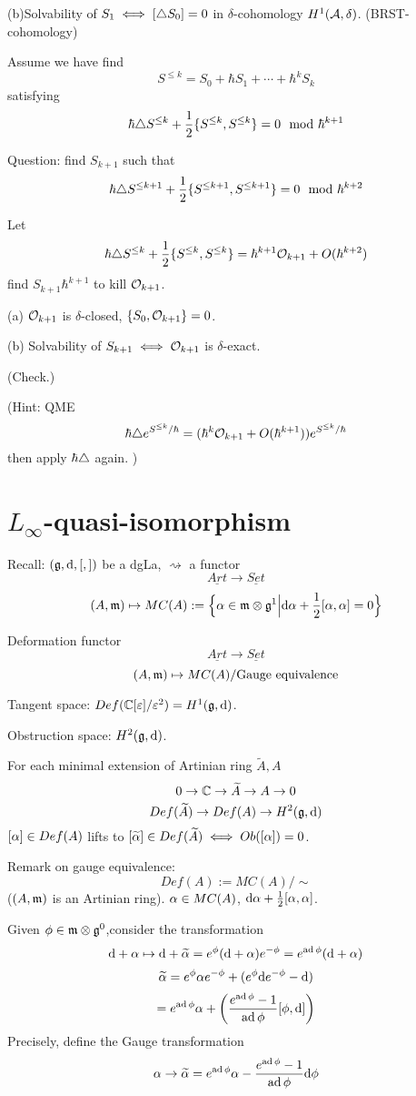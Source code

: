 (b)Solvability of $S_1\iff[\triangle S_0]=0$ in $\delta$-cohomology $H^1(\mathcal{A},\delta)$.
(BRST-cohomology)

Assume we have find
$$S^{\leq k}=S_0+\hbar S_1+\cdots+\hbar^k S_k$$
satisfying
$$\hbar\triangle S^{\leq k}+\frac{1}{2}\{S^{\leq k},S^{\leq k}\}=0\mod\hbar^{k+1}$$

Question: find $S_{k+1}$ such that
$$\hbar\triangle S^{\leq k+1}+
\frac{1}{2}\{S^{\leq k+1},S^{\leq k+1}\}=0\mod\hbar^{k+2}$$

Let
$$\hbar\triangle S^{\leq k}+\frac{1}{2}\{S^{\leq k},S^{\leq k}\}
=\hbar^{k+1}\mathcal{O}_{k+1}+O(\hbar^{k+2})$$
find $S_{k+1}\hbar^{k+1}$ to kill $\mathcal{O}_{k+1}$.

(a) $\mathcal{O}_{k+1}$ is $\delta$-closed, $\{S_0,\mathcal{O}_{k+1}\}=0$.

(b) Solvability of $S_{k+1}\iff \mathcal{O}_{k+1}$ is $\delta$-exact.

(Check.)

(Hint: QME
$$\hbar \triangle e^{S^{\leq k}/\hbar}
=(\hbar^k\mathcal{O}_{k+1}+O(\hbar^{k+1}))e^{S^{\leq k}/\hbar}$$
then apply $\hbar\triangle$ again.
)



\section{$L_\infty$-quasi-isomorphism}
Recall: 
$(\mathfrak{g},\mathrm{d},[,])$ be a dgLa, $\rightsquigarrow$ a functor
$$\underline{Art}\to \underline{Set}$$
$$(A,\mathfrak{m})\mapsto MC(A):=
\Big\{ \alpha\in\mathfrak{m}\otimes\mathfrak{g}^1 \Big| \mathrm{d}\alpha+\frac{1}{2}[\alpha,\alpha]=0 \Big\}$$

Deformation functor
$$\underline{Art}\to\underline{Set}$$
$$(A,\mathfrak{m})\mapsto MC(A)/\text{Gauge equivalence}$$

Tangent space: $Def(\mathbb{C}[\varepsilon]/\varepsilon^2)=H^1(\mathfrak{g},\mathrm{d})$.

Obstruction space: $H^2(\mathfrak{g},\mathrm{d})$.

For each minimal extension of Artinian ring $\widetilde{A},A$
$$0\to\mathbb{C}\to\widetilde{A}\to A\to 0$$
$$Def(\widetilde{A})\to Def(A)\to H^2(\mathfrak{g},\mathrm{d})$$
$[\alpha]\in Def(A)$ lifts to $[\widetilde{\alpha}]\in Def(\widetilde{A})
\iff Ob([\alpha])=0$.

Remark on gauge equivalence:
$$Def(A):=MC(A)/\sim$$
($(A,\mathfrak{m})$ is an Artinian ring). $\alpha\in MC(A)$,
$\mathrm{d}\alpha+\frac{1}{2}[\alpha,\alpha]$.

Given $\phi \in \mathfrak{m}\otimes\mathfrak{g}^0$,consider the transformation
$$\mathrm{d}+\alpha\mapsto \mathrm{d}+\widetilde{\alpha}=e^{\phi}(\mathrm{d}+\alpha)e^{-\phi}=e^{\operatorname{ad}\phi}(\mathrm{d}+\alpha)$$
$$\widetilde{\alpha}=e^\phi\alpha e^{-\phi}+(e^\phi\mathrm{d} e^{-\phi}-\mathrm{d})$$
$$
  =e^{\operatorname{ad}\phi}\alpha+
  \left(
    \frac{e^{\operatorname{ad}\phi}-1}{\operatorname{ad}\phi}
    [\phi,\mathrm{d}]
  \right)
$$
Precisely, define the Gauge transformation
$$\alpha\to\widetilde{\alpha}=e^{\operatorname{ad}\phi}\alpha-\frac{e^{\operatorname{ad}\phi}-1}{\operatorname{ad}\phi}\mathrm{d}\phi$$

